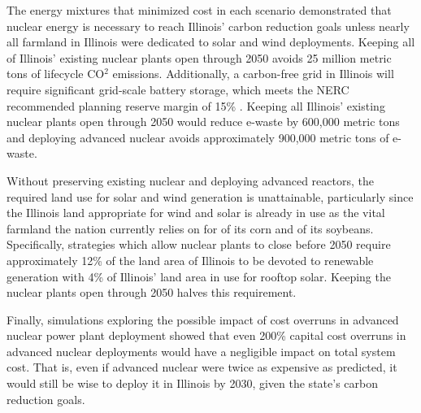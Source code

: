 The energy mixtures that minimized cost in each scenario demonstrated that nuclear energy is necessary to 
reach Illinois' carbon reduction goals unless nearly all farmland in 
Illinois were dedicated to solar and wind deployments. 
Keeping all of Illinois' existing nuclear plants open through 2050 avoids 25 
million metric tons of lifecycle CO$^2$ emissions. 
Additionally, a carbon-free grid in Illinois will require significant 
grid-scale battery storage,  which meets the \gls{NERC} recommended planning 
reserve margin of 15\% \cite{nerc_reserve_margin}.
Keeping all Illinois' existing nuclear plants open through 2050 would reduce 
e-waste by 600,000 metric tons and deploying advanced nuclear avoids 
approximately 900,000 metric tons of e-waste. 

Without preserving existing nuclear and deploying advanced reactors, the 
required land use for solar and wind generation is 
unattainable, particularly since the Illinois land appropriate for wind and solar 
is already in use as the vital farmland the nation currently relies on for  of its 
corn and  of its soybeans.
Specifically, strategies which allow nuclear plants to close before 2050 
require approximately 12\% of the land area of Illinois to be devoted to 
renewable generation  with  4\% of Illinois' land area in use for rooftop solar. 
Keeping the nuclear plants open through 2050 halves this requirement.

Finally, simulations exploring the possible impact of cost overruns in advanced nuclear power 
plant deployment showed that even 200\% capital cost overruns in advanced 
nuclear deployments would have a negligible impact on total system cost.
That is, even if advanced nuclear were twice as expensive as predicted, it 
would still be wise to deploy it in Illinois by 2030, given the state's carbon 
reduction goals.

